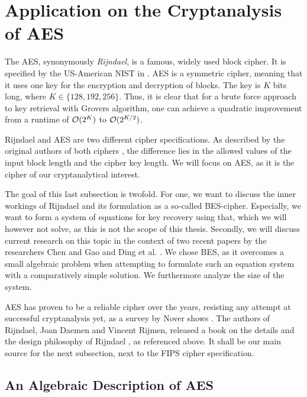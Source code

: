 \section{Application on the Cryptanalysis of AES} \label{application_on_the_cryptanalysis_of_aes}

The AES, synonymously \emph{Rijndael}, is a famous, widely used block cipher. It is specified by the US-American NIST in \cite{Dworkin2001}. AES is a symmetric cipher, meaning that it uses one key for the encryption and decryption of blocks. The key is \(K\) bits long, where \(K \in \{128, 192, 256\}\). Thus, it is clear that for a brute force approach to key retrieval with Grovers algorithm, one can achieve a quadratic improvement from a runtime of \(\operatorname{\mathcal{O}}(2^K)\) to \(\operatorname{\mathcal{O}}(2^{K/2})\).

Rijndael and AES are two different cipher specifications. As described by the original authors of both ciphers \cite[p. 31]{Daemen_2020}, the difference lies in the allowed values of the input block length and the cipher key length. We will focus on AES, as it is the cipher of our cryptanalytical interest.

The goal of this last subsection is twofold. For one, we want to discuss the inner workings of Rijndael and its formulation as a so-called BES-cipher. Especially, we want to form a system of equations for key recovery using that, which we will however not solve, as this is not the scope of this thesis. Secondly, we will discuss current research on this topic in the context of two recent papers by the researchers Chen and Gao \cite{Chen2017} and Ding et al. \cite{Ding2021}. We chose BES, as it overcomes a small algebraic problem when attempting to formulate such an equation system with a comparatively simple solution. We furthermore analyze the size of the system.

AES has proven to be a reliable cipher over the years, resisting any attempt at successful cryptanalysis yet, as a survey by Nover shows \cite{Nover}. The authors of Rijndael, Joan Daemen and Vincent Rijmen, released a book on the details and the design philosophy of Rijndael \cite{Daemen_2020}, as referenced above. It shall be our main source for the next subsection, next to the FIPS cipher specification.

\subsection{An Algebraic Description of AES } \label{an_algebraic_description_of_aes}

